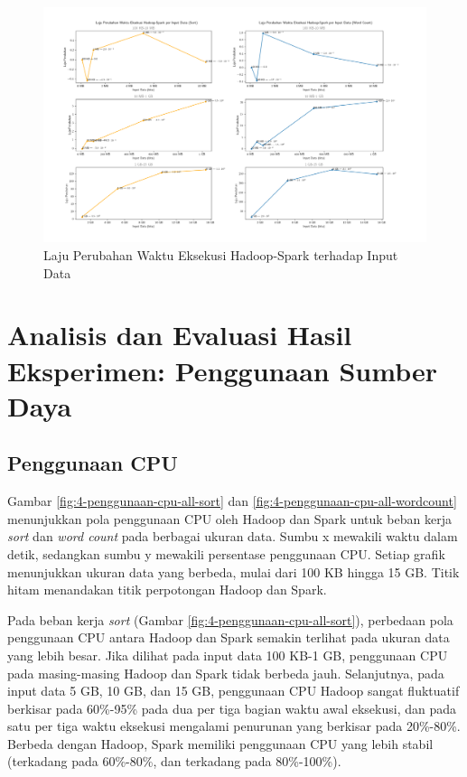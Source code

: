 \begin{landscape}
\begin{figure}[h]
    \centering
    \includegraphics[height=0.6\linewidth]{figures/ch04/3-0-hadoop-spark}
    \caption{Laju Perubahan Waktu Eksekusi Hadoop-Spark terhadap Input Data}
    \label{fig:3-grup-hadoop-spark}
\end{figure}
\end{landscape}



\newpage
\section{Analisis dan Evaluasi Hasil Eksperimen: Penggunaan Sumber Daya}
\subsection{Penggunaan CPU}
Gambar \ref{fig:4-penggunaan-cpu-all-sort} dan \ref{fig:4-penggunaan-cpu-all-wordcount} menunjukkan pola penggunaan CPU oleh Hadoop dan Spark untuk beban kerja \textit{sort} dan \textit{word count} pada berbagai ukuran data. Sumbu x mewakili waktu dalam detik, sedangkan sumbu y mewakili persentase penggunaan CPU. Setiap grafik menunjukkan ukuran data yang berbeda, mulai dari 100 KB hingga 15 GB. Titik hitam menandakan titik perpotongan Hadoop dan Spark.


Pada beban kerja \textit{sort} (Gambar \ref{fig:4-penggunaan-cpu-all-sort}), perbedaan pola penggunaan CPU antara Hadoop dan Spark semakin terlihat pada ukuran data yang lebih besar. Jika dilihat pada input data 100 KB-1 GB, penggunaan CPU pada masing-masing Hadoop dan Spark tidak berbeda jauh. Selanjutnya, pada input data 5 GB, 10 GB, dan 15 GB, penggunaan CPU Hadoop sangat fluktuatif berkisar pada 60\%-95\% pada dua per tiga bagian waktu awal eksekusi, dan pada satu per tiga waktu eksekusi mengalami penurunan yang berkisar pada 20\%-80\%. Berbeda dengan Hadoop, Spark memiliki penggunaan CPU yang lebih stabil (terkadang pada 60\%-80\%, dan terkadang pada 80\%-100\%).

